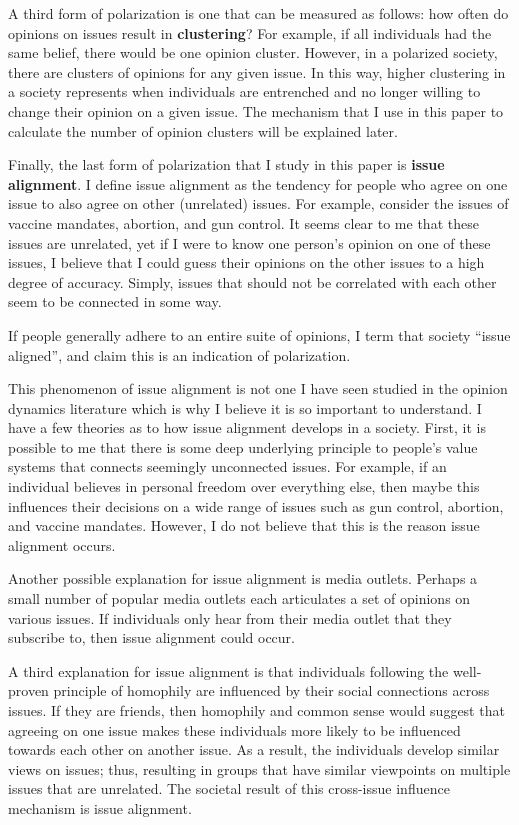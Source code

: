 A third form of polarization is one that can be measured as follows:
how often do opinions on issues result in \textbf{clustering}? For
example, if all individuals had the same belief, there would be one opinion
cluster. However, in a polarized society, there are clusters of opinions for any given issue. In this way, higher clustering in a society represents when individuals are entrenched and no longer willing to change their opinion on a given issue. The mechanism that I use in this paper to calculate the number of opinion clusters will be explained later.

Finally, the last form of polarization that I study in this paper is \textbf{issue alignment}. I define issue alignment as the tendency for people who agree on one issue to also agree on other (unrelated) issues. For example, consider the issues of vaccine mandates, abortion, and gun control. It seems clear to me that these issues are unrelated, yet if I were to know one person's opinion on one of these issues, I believe that I could guess their opinions on the other issues to a high degree of accuracy. Simply, issues that should not be correlated with each other seem to be connected in some way. 

If people generally adhere to an entire suite of opinions, I term that society ``issue aligned'', and claim this is an indication of polarization. 

This phenomenon of issue alignment is not one I have seen studied in the opinion dynamics literature which is why I believe it is so important to understand. I have a few theories as to how issue alignment develops in a society. First, it is possible to me that there is some deep underlying principle to people's value systems that connects seemingly unconnected issues. For example, if an individual believes in personal freedom over everything else, then maybe this influences their decisions on a wide range of issues such as gun control, abortion, and vaccine mandates. However, I do not believe that this is the reason issue alignment occurs. 

Another possible explanation for issue alignment is media outlets. Perhaps a small number of popular media outlets each articulates a set of opinions on various issues. If individuals only hear from their media outlet that they subscribe to, then issue alignment could occur.

A third explanation for issue alignment is that individuals following the well-proven principle of homophily are influenced by their social connections across issues. If they are friends, then homophily and common sense would suggest that agreeing on one issue makes these individuals more likely to be influenced towards each other on another issue. As a result, the individuals develop similar views on issues; thus, resulting in groups that have similar viewpoints on multiple issues that are unrelated. The societal result of this cross-issue influence mechanism is issue alignment.   
